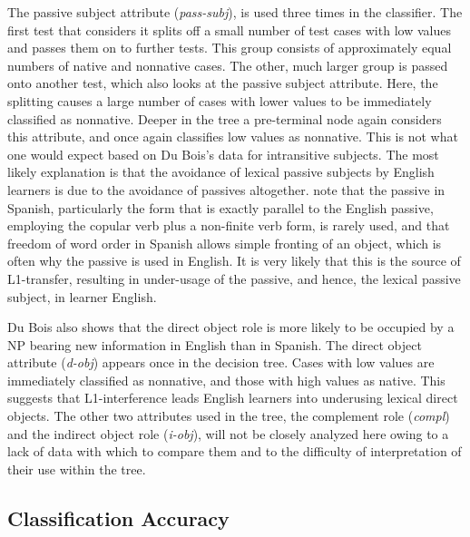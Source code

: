 \documentclass[main.tex]{subfiles}
\begin{document}
The passive subject attribute (\textit{pass-subj}), is used three times in the classifier. The first test that considers it splits off a small number of test cases with low values and passes them on to further tests. This group consists of approximately equal numbers of native and nonnative cases. The other, much larger group is passed onto another test, which also looks at the passive subject attribute. Here, the splitting causes a large number of cases with lower values to be immediately classified as nonnative. Deeper in the tree a pre-terminal node again considers this attribute, and once again classifies low values as nonnative. This is not what one would expect based on Du Bois's data for intransitive subjects. The most likely explanation is that the avoidance of lexical passive subjects by English learners is due to the avoidance of passives altogether. \citet[28.2.3]{butt} note that the passive in Spanish, particularly the form that is exactly parallel to the English passive, employing the copular verb plus a non-finite verb form, is rarely used, and that freedom of word order in Spanish allows simple fronting of an object, which is often why the passive is used in English. It is very likely that this is the source of L1-transfer, resulting in under-usage of the passive, and hence, the lexical passive subject, in learner English.

Du Bois also shows that the direct object role is more likely to be occupied by a NP bearing new information in English than in Spanish. The direct object attribute (\textit{d-obj}) appears once in the decision tree. Cases with low values are immediately classified as nonnative, and those with high values as native. This suggests that L1-interference leads English learners into underusing lexical direct objects. The other two attributes used in the tree, the complement role (\textit{compl}) and the indirect object role (\textit{i-obj}), will not be closely analyzed here owing to a lack of data with which to compare them and to the difficulty of interpretation of their use within the tree.

\subsection{Classification Accuracy}
\end{document}
